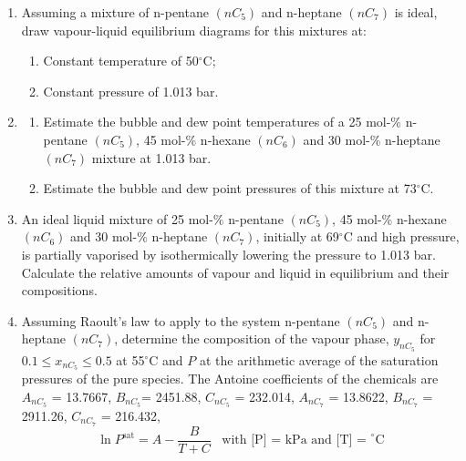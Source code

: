 \documentclass[12pts,a4paper,amsmath,amssymb,floatfix]{article}%
\renewcommand\leq{\leqslant}
\newcommand{\frc}{\displaystyle\frac}
\begin{document}
\begin{enumerate}[label=\bfseries Problem \arabic*:]

\item\label{Example_01}Assuming a mixture of n-pentane $\left(nC_{5}\right)$ and n-heptane $\left(nC_{7}\right)$ is ideal, draw vapour-liquid equilibrium diagrams for this mixtures at:
    \begin{enumerate}
        \item Constant temperature of 50$^{\circ}$C;
        \item Constant pressure of 1.013 bar.
    \end{enumerate}

\item\label{Example_02}
    \begin{enumerate}
        \item Estimate the bubble and dew point temperatures of a 25 mol-$\%$ n-pentane $\left(nC_{5}\right)$, 45 mol-$\%$ n-hexane $\left(nC_{6}\right)$ and 30 mol-$\%$ n-heptane $\left(nC_{7}\right)$ mixture at 1.013 bar. 
        \item  Estimate the bubble and dew point pressures of this mixture at 73$^{\circ}$C.
    \end{enumerate}

\item\label{Example_03} An ideal liquid mixture of 25 mol-$\%$ n-pentane $\left(nC_{5}\right)$, 45 mol-$\%$ n-hexane $\left(nC_{6}\right)$ and 30 mol-$\%$ n-heptane $\left(nC_{7}\right)$, initially at 69$^{\circ}$C and high pressure, is partially vaporised by isothermically lowering the pressure to 1.013 bar. Calculate the relative amounts of vapour and liquid in equilibrium and their compositions.

\item\label{Tut05P1} Assuming Raoult's law to apply to the system n-pentane $\left(nC_{5}\right)$ and n-heptane $\left(nC_{7}\right)$, determine the composition of the vapour phase, $y_{nC_{5}}$ for $0.1\leq x_{nC_{5}}\leq 0.5$ at 55$^{\circ}$C and $P$ at the arithmetic average of the saturation pressures of the pure species. The Antoine coefficients of the chemicals are $A_{nC_{5}}$ = 13.7667, $B_{nC_{5}}$= 2451.88, $C_{nC_{5}}$ = 232.014, $A_{nC_{7}}$ = 13.8622, $B_{nC_{7}}$ = 2911.26, $C_{nC_{7}}$ = 216.432,
\begin{displaymath}
\ln P^{\text{sat}} = A - \frc{B}{T + C}\;\;\;\text{with [P] = kPa and [T] = }^{\circ}\text{C}
\end{displaymath} 



\end{enumerate}
\end{document}
